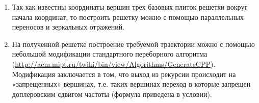 \explanationSection

\begin{enumerate}
    \item Так как известны координаты вершин трех базовых плиток решетки вокруг начала координат, то построить решетку можно с помощью параллельных переносов и зеркальных отражений.
    \item На полученной решетке построение требуемой траектории можно с помощью небольшой модификации стандартного переборного алгоритма (\url{http://acm.mipt.ru/twiki/bin/view/Algorithms/GenerateCPP}). Модификация заключается в том, что выход из рекурсии происходит на «запрещенных» вершинах, т.е. таких вершинах переход в которые запрещен доплеровским сдвигом частоты (формула приведена в условии).
\end{enumerate}